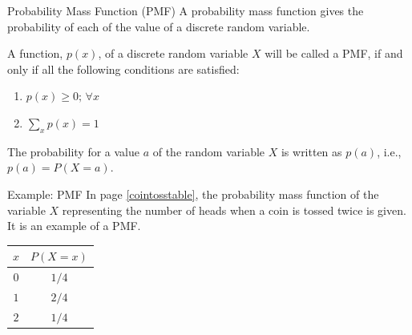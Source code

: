 \documentclass[12pt, aspectratio=169]{beamer}
\begin{document}
	\begin{frame}{Probability Mass Function (PMF)}
		A probability mass function gives the probability of each of the value of a discrete random variable.

		\vspace{0.5em}

		A function, $p(x)$, of a discrete random variable $X$ will be called a PMF, if and only if all the following conditions are satisfied:
		\begin{enumerate}
			\item $p(x) \ge 0; \, \forall x$
			\item $\displaystyle \sum_{x} p(x) = 1$
		\end{enumerate}

		The probability for a value \(a\) of the random variable \(X\) is written as \(p(a)\), i.e., $p(a) = P(X = a)$.
	\end{frame}


	\begin{frame}{Example: PMF}
		In page \ref{cointosstable}, the probability mass function of the variable $X$ representing the number of heads when a coin is tossed twice is given. It is an example of a PMF.

		\begin{center}
				\begin{tabular}{c|c}
					\hline
					$x$ & $P(X = x)$ \\
					\hline
					$0$ & $1/4$ \\
					$1$ & $2/4$ \\
					$2$ & $1/4$ \\
					\hline
				\end{tabular}
			\end{center}
	\end{frame}
\end{document}
